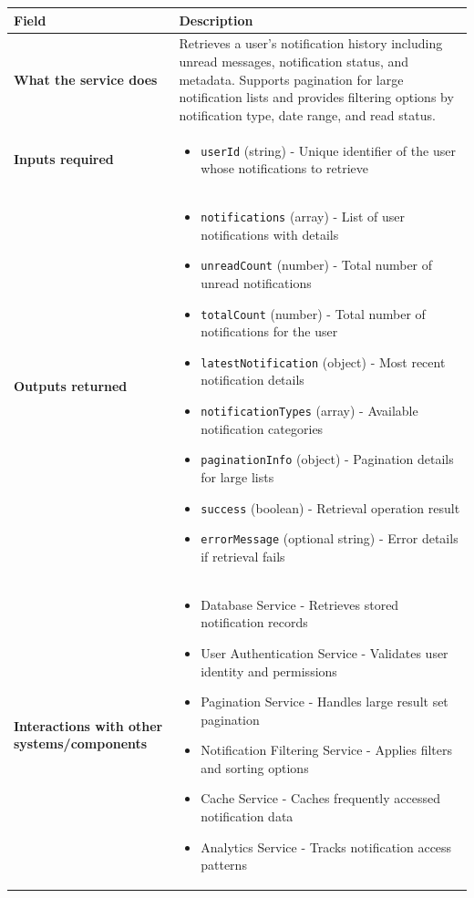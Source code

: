 \documentclass[11pt,a4paper]{article}
\begin{document}
\begin{longtable}{|p{3cm}|p{12cm}|}
\hline
\textbf{Field} & \textbf{Description} \\
\hline
\textbf{What the service does} & 
Retrieves a user's notification history including unread messages, notification status, and metadata. Supports pagination for large notification lists and provides filtering options by notification type, date range, and read status. \\
\hline
\textbf{Inputs required} & 
\begin{itemize}[nosep]
\item \texttt{userId} (string) - Unique identifier of the user whose notifications to retrieve
\end{itemize} \\
\hline
\textbf{Outputs returned} & 
\begin{itemize}[nosep]
\item \texttt{notifications} (array) - List of user notifications with details
\item \texttt{unreadCount} (number) - Total number of unread notifications
\item \texttt{totalCount} (number) - Total number of notifications for the user
\item \texttt{latestNotification} (object) - Most recent notification details
\item \texttt{notificationTypes} (array) - Available notification categories
\item \texttt{paginationInfo} (object) - Pagination details for large lists
\item \texttt{success} (boolean) - Retrieval operation result
\item \texttt{errorMessage} (optional string) - Error details if retrieval fails
\end{itemize} \\
\hline
\textbf{Interactions with other systems/components} & 
\begin{itemize}[nosep]
\item Database Service - Retrieves stored notification records
\item User Authentication Service - Validates user identity and permissions
\item Pagination Service - Handles large result set pagination
\item Notification Filtering Service - Applies filters and sorting options
\item Cache Service - Caches frequently accessed notification data
\item Analytics Service - Tracks notification access patterns
\end{itemize} \\
\hline
\end{longtable}
\end{document}
